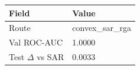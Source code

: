 \begin{tabular}{ll}
\toprule
Field & Value \\
\midrule
Route & convex_sar_rga \\
Val ROC-AUC & 1.0000 \\
Test $\Delta$ vs SAR & 0.0033 \\
\bottomrule
\end{tabular}
